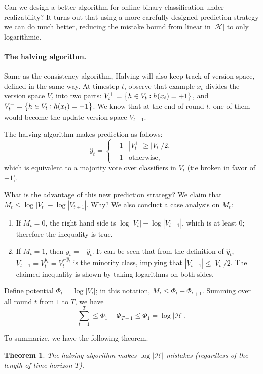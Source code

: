 \documentclass{article}
\newtheorem{theorem}{Theorem}
\newcommand{\Hcal}{\mathcal{H}}
\begin{document}
Can we design a better algorithm for online binary classification under realizability?
It turns out that using a more carefully designed prediction strategy we can do much better, reducing the mistake bound from linear in $|\Hcal|$ to only logarithmic.

\paragraph{The halving algorithm.} Same as the consistency algorithm, Halving will also keep track of version space, defined in the same way. At timestep $t$, observe that example $x_t$ divides the version space $V_t$ into two parts: $V_t^+ = \cbr{h \in V_t: h(x_t) = +1}$, and $V_t^- = \cbr{h \in V_t: h(x_t) = -1}$. We know that at the end of round $t$, one of them would become the update version space $V_{t+1}$.

The halving algorithm makes prediction as follows:
\[ \hat{y}_t = \begin{cases} +1 & |V_t^+| \geq |V_t| / 2, \\ -1 & \text{otherwise}, \end{cases} \]
which is equivalent to a majority vote over classifiers in $V_t$ (tie broken in favor of $+1$).

What is the advantage of this new prediction strategy? We claim that $M_t \leq \log |V_t| - \log |V_{t+1}|$. Why? We also conduct a case analysis on $M_t$:
\begin{enumerate}
  \item If $M_t = 0$, the right hand side is $\log |V_t| - \log |V_{t+1}|$, which is at least $0$; therefore the inequality is true.
  \item If $M_t = 1$, then $y_t = -\hat{y}_t$. It can be seen that from the definition of $\hat{y}_t$, $V_{t+1} = V_t^{y_t} = V_t^{-\hat{y}_t}$ is the minority class, implying that $|V_{t+1}| \leq |V_t| / 2$. The claimed inequality is shown by taking logarithms on both sides.
\end{enumerate}

Define potential $\Phi_t = \log|V_t|$; in this notation, $M_t \leq \Phi_t - \Phi_{t+1}$. Summing over all round $t$ from $1$ to $T$, we have
\[ \sum_{t=1}^T \leq \Phi_1 - \Phi_{T+1} \leq \Phi_1 = \log|\Hcal|. \]

To summarize, we have the following theorem.
\begin{theorem}
The halving algorithm makes $\log |\Hcal|$ mistakes (regardless of the length of time horizon $T$).
\label{thm:halv}
\end{theorem}
\end{document}
